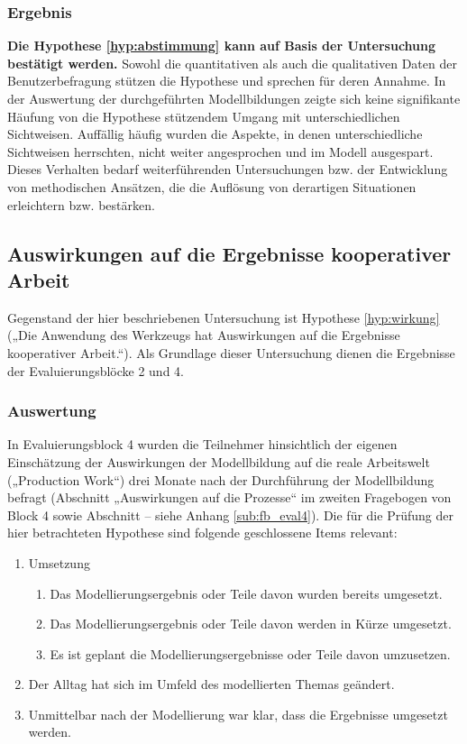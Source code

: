 \subsubsection{Ergebnis} 

\textbf{Die Hypothese \ref{hyp:abstimmung} kann auf Basis der Untersuchung bestätigt werden.} Sowohl die quantitativen als auch die qualitativen Daten der Benutzerbefragung stützen die Hypothese und sprechen für deren Annahme. In der Auswertung der durchgeführten Modellbildungen zeigte sich keine signifikante Häufung von die Hypothese stützendem Umgang mit unterschiedlichen Sichtweisen. Auffällig häufig wurden die Aspekte, in denen unterschiedliche Sichtweisen herrschten, nicht weiter angesprochen und im Modell ausgespart. Dieses Verhalten bedarf weiterführenden Untersuchungen bzw. der Entwicklung von methodischen Ansätzen, die die Auflösung von derartigen Situationen erleichtern bzw. bestärken.


\subsection{Auswirkungen auf die Ergebnisse kooperativer Arbeit} %
\label{sub:auswirkungen_auf_die_ergebnisse_kooperativer_arbeit}

Gegenstand der hier beschriebenen Untersuchung ist Hypothese \ref{hyp:wirkung} („Die Anwendung des Werkzeugs hat Auswirkungen auf die Ergebnisse kooperativer Arbeit.“). Als Grundlage dieser Untersuchung dienen die Ergebnisse der Evaluierungsblöcke 2 und 4.

\subsubsection{Auswertung} 

In Evaluierungsblock 4 wurden die Teilnehmer hinsichtlich der eigenen Einschätzung der Auswirkungen der Modellbildung auf die reale Arbeitswelt („Production Work“) drei Monate nach der Durchführung der Modellbildung befragt (Abschnitt „Auswirkungen auf die Prozesse“ im zweiten Fragebogen von Block 4 sowie Abschnitt  -- siehe Anhang \ref{sub:fb_eval4}). Die für die Prüfung der hier betrachteten Hypothese sind folgende geschlossene Items relevant:

\begin{enumerate}
	
	\item Umsetzung
		\begin{enumerate}
			\item Das Modellierungsergebnis oder Teile davon wurden bereits umgesetzt.
			\item Das Modellierungsergebnis oder Teile davon werden in Kürze umgesetzt.
			\item Es ist geplant die Modellierungsergebnisse oder Teile davon umzusetzen.
		\end{enumerate}
	\item Der Alltag hat sich im Umfeld des modellierten Themas geändert.
	\item Unmittelbar nach der Modellierung war klar, dass die Ergebnisse umgesetzt werden.
\end{enumerate}

